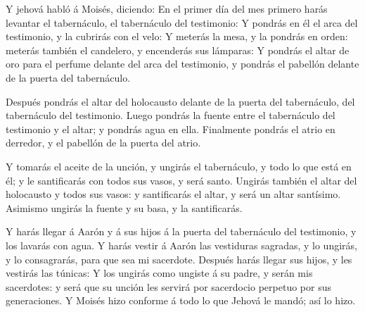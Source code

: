  Y jehová habló á Moisés, diciendo:  En el
primer día del mes primero harás levantar el tabernáculo, el tabernáculo
del testimonio:  Y pondrás en él el arca del testimonio, y
la cubrirás con el velo:  Y meterás la mesa, y la pondrás en
orden: meterás también el candelero, y encenderás sus lámparas:
 Y pondrás el altar de oro para el perfume delante del arca
del testimonio, y pondrás el pabellón delante de la puerta del
tabernáculo.

 Después pondrás el altar del holocausto delante de la
puerta del tabernáculo, del tabernáculo del testimonio. 
Luego pondrás la fuente entre el tabernáculo del testimonio y el altar;
y pondrás agua en ella.  Finalmente pondrás el atrio en
derredor, y el pabellón de la puerta del atrio.

 Y tomarás el aceite de la unción, y ungirás el tabernáculo,
y todo lo que está en él; y le santificarás con todos sus vasos, y será
santo.  Ungirás también el altar del holocausto y todos sus
vasos: y santificarás el altar, y será un altar santísimo. 
Asimismo ungirás la fuente y su basa, y la santificarás.

 Y harás llegar á Aarón y á sus hijos á la puerta del
tabernáculo del testimonio, y los lavarás con agua.  Y
harás vestir á Aarón las vestiduras sagradas, y lo ungirás, y lo
consagrarás, para que sea mi sacerdote.  Después harás
llegar sus hijos, y les vestirás las túnicas:  Y los
ungirás como ungiste á su padre, y serán mis sacerdotes: y será que su
unción les servirá por sacerdocio perpetuo por sus generaciones.
 Y Moisés hizo conforme á todo lo que Jehová le mandó; así
lo hizo.

